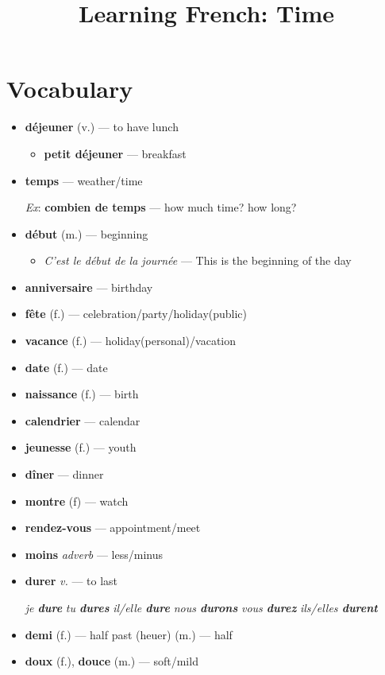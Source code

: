 \documentclass[a4paper,12pt]{article}
\title{Learning French: Time}
\begin{document}
\section{Vocabulary}
	\begin{itemize}
	
		\item \textbf{d\'ejeuner} (v.) --- to have lunch
		\begin{itemize}
			\item \textbf{petit d\'ejeuner} --- breakfast
		\end{itemize}
		\item \textbf{temps} --- weather/time
		\par
		\textit{Ex}: \textbf{combien de temps} --- how much time? how long?
		\item \textbf{d\'ebut} (m.) --- beginning
		\begin{itemize}
			\item \textit{C'est le d\'ebut de la journ\'ee} --- This is the beginning of the day
		\end{itemize}


		\item \textbf{anniversaire} --- birthday
		\item \textbf{f\^ete} (f.) --- celebration/party/holiday(public)
		\item \textbf{vacance} (f.) --- holiday(personal)/vacation
		\item \textbf{date} (f.) --- date 
		\item \textbf{naissance} (f.) --- birth
		\item \textbf{calendrier} --- calendar
		\item \textbf{jeunesse} (f.) --- youth
		\item \textbf{d\^iner} --- dinner
		\item \textbf{montre} (f) --- watch
		\item \textbf{rendez-vous} --- appointment/meet
		\item \textbf{moins} \textit{adverb} --- less/minus
		\item \textbf{durer} \textit{v.} --- to last
		\par
		\textit{je \textbf{dure}} \quad \textit{tu \textbf{dures}} \quad \textit{il/elle \textbf{dure}} \quad \textit{nous \textbf{durons}} \quad \textit{vous \textbf{durez}} \quad \textit{ils/elles \textbf{durent}}
		\item \textbf{demi} (f.) --- half past (heuer) \qquad (m.) --- half
		\item \textbf{doux} (f.), \textbf{douce} (m.) --- soft/mild
	\end{itemize}
\end{document}
